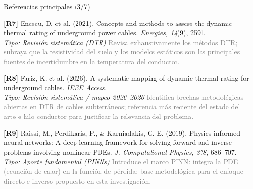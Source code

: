 \documentclass[aspectratio=169]{beamer}
\begin{document}
\begin{frame}{Referencias principales (3/7)}
\small\justifying

\textbf{[R7]} Enescu, D. et al. (2021). Concepts and methods to assess the
dynamic thermal rating of underground power cables. \textit{Energies,
14}(9), 2591.\\
\textcolor{blue!60!black}{\footnotesize\textit{Tipo: Revisión sistemática (DTR)}} \quad
\textcolor{gray}{\footnotesize Revisa exhaustivamente los métodos DTR; subraya
que la resistividad del suelo y los modelos estáticos son las principales
fuentes de incertidumbre en la temperatura del conductor.}

\medskip
\textbf{[R8]} Fariz, K. et al. (2026). A systematic mapping of dynamic thermal
rating for underground cables. \textit{IEEE Access.}\\
\textcolor{blue!60!black}{\footnotesize\textit{Tipo: Revisión sistemática / mapeo 2020--2026}} \quad
\textcolor{gray}{\footnotesize Identifica brechas metodológicas abiertas en DTR
de cables subterráneos; referencia más reciente del estado del arte e hilo
conductor para justificar la relevancia del problema.}

\medskip
\textbf{[R9]} Raissi, M., Perdikaris, P., \& Karniadakis, G. E. (2019).
Physics-informed neural networks: A deep learning framework for solving forward
and inverse problems involving nonlinear PDEs. \textit{J. Computational
Physics, 378}, 686--707.\\
\textcolor{blue!60!black}{\footnotesize\textit{Tipo: Aporte fundamental (PINNs)}} \quad
\textcolor{gray}{\footnotesize Introduce el marco PINN: integra la PDE (ecuación
de calor) en la función de pérdida; base metodológica para el enfoque directo
e inverso propuesto en esta investigación.}
\end{frame}
\end{document}
